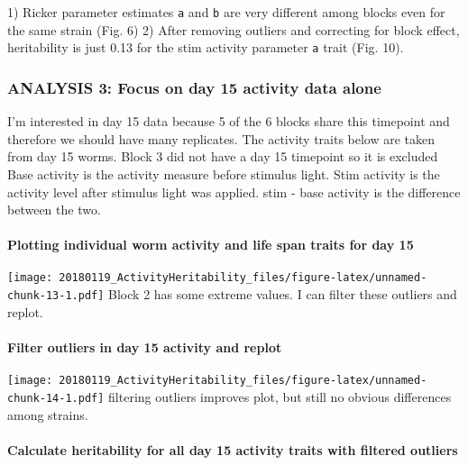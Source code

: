 \documentclass[]{article}
\let\oldparagraph\paragraph
\renewcommand{\paragraph}[1]{\oldparagraph{#1}\mbox{}}
\begin{document}
 1) Ricker parameter estimates \texttt{a} and \texttt{b} are very
different among blocks even for the same strain (Fig. 6) 2) After
removing outliers and correcting for block effect, heritability is just
0.13 for the stim activity parameter \texttt{a} trait (Fig. 10).

\hypertarget{analysis-3-focus-on-day-15-activity-data-alone}{%
\subsubsection{ANALYSIS 3: Focus on day 15 activity data
alone}\label{analysis-3-focus-on-day-15-activity-data-alone}}

 I'm interested in day 15 data because 5 of the 6 blocks share this
timepoint and therefore we should have many replicates. The activity
traits below are taken from day 15 worms. Block 3 did not have a day 15
timepoint so it is excluded Base activity is the activity measure before
stimulus light. Stim activity is the activity level after stimulus light
was applied. stim - base activity is the difference between the two.

\hypertarget{plotting-individual-worm-activity-and-life-span-traits-for-day-15}{%
\paragraph{Plotting individual worm activity and life span traits for
day
15}\label{plotting-individual-worm-activity-and-life-span-traits-for-day-15}}

\texttt{[image: 20180119\_ActivityHeritability\_files/figure-latex/unnamed-chunk-13-1.pdf]}
Block 2 has some extreme values. I can filter these outliers and replot.

\hypertarget{filter-outliers-in-day-15-activity-and-replot}{%
\paragraph{Filter outliers in day 15 activity and
replot}\label{filter-outliers-in-day-15-activity-and-replot}}

\texttt{[image: 20180119\_ActivityHeritability\_files/figure-latex/unnamed-chunk-14-1.pdf]}
filtering outliers improves plot, but still no obvious differences among
strains.

\hypertarget{calculate-heritability-for-all-day-15-activity-traits-with-filtered-outliers}{%
\paragraph{Calculate heritability for all day 15 activity traits with
filtered
outliers}\label{calculate-heritability-for-all-day-15-activity-traits-with-filtered-outliers}}
\end{document}
